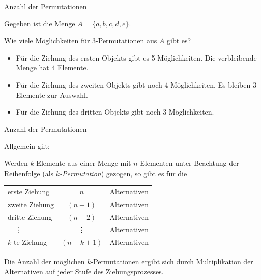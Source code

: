 \documentclass[12pt,ngerman,a4paper,ignorenonframetext,]{beamer}
\providecommand{\tightlist}{%
  \setlength{\itemsep}{0pt}\setlength{\parskip}{0pt}}
\begin{document}
\begin{frame}{Anzahl der Permutationen}
\protect\hypertarget{anzahl-der-permutationen}{}

Gegeben ist die Menge \(A=\{a,b,c,d,e\}\).

Wie viele Möglichkeiten für 3-Permutationen aus \(A\) gibt es?

\begin{itemize}
\tightlist
\item
  Für die Ziehung des ersten Objekts gibt es 5 Möglichkeiten. Die
  verbleibende Menge hat 4 Elemente.
\item
  Für die Ziehung des zweiten Objekts gibt noch 4 Möglichkeiten. Es
  bleiben 3 Elemente zur Auswahl.
\item
  Für die Ziehung des dritten Objekts gibt noch 3 Möglichkeiten.
\end{itemize}

\end{frame}

\begin{frame}{Anzahl der Permutationen}
\protect\hypertarget{anzahl-der-permutationen-1}{}

Allgemein gilt:

Werden \(k\) Elemente aus einer Menge mit \(n\) Elementen unter
Beachtung der Reihenfolge (als \emph{\(k\)-Permutation}) gezogen, so
gibt es für die

\begin{tabular}{lcl}
        erste Ziehung   & $n$       & Alternativen \\  
        zweite Ziehung  & $(n-1)$   & Alternativen \\  
        dritte Ziehung  & $(n-2)$   & Alternativen \\  
        $\quad $\vdots  & \vdots    & Alternativen \\ 
        $k$-te Ziehung  & $(n-k+1)$ & Alternativen 
\end{tabular}

Die Anzahl der möglichen \(k\)-Permutationen ergibt sich durch
Multiplikation der Alternativen auf jeder Stufe des Ziehungsprozesses.

\end{frame}
\end{document}
